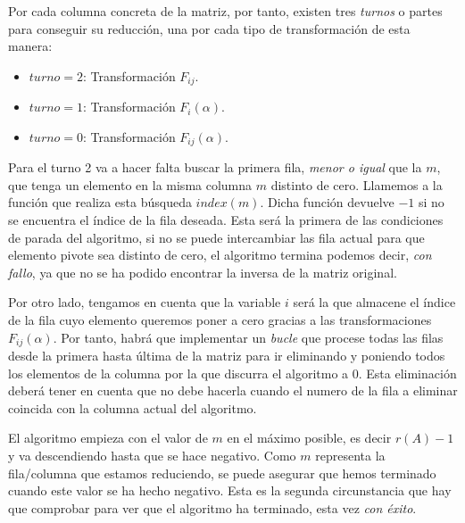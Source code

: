\documentclass[a4paper,10pt]{article}
\begin{document}
Por cada columna concreta de la matriz, por tanto, existen tres \emph{turnos} o partes para conseguir su reducción, una por cada tipo de transformación de esta manera:

\par \vspace{10pt}

\begin{itemize}
	\item $turno = 2$: Transformación $F_{ij}$.
	\item $turno = 1$: Transformación $F_{i}(\alpha)$.
	\item $turno = 0$: Transformación $F_{ij}(\alpha)$.
\end{itemize}

\par \vspace{10pt}

Para el turno 2 va a hacer falta buscar la primera fila, \emph{menor o igual} que la $m$, que tenga un elemento en la misma columna $m$ distinto de cero. Llamemos a la función que realiza esta búsqueda $index(m)$. Dicha función devuelve $-1$ si no se encuentra el índice de la fila deseada. Esta será la primera de las condiciones de parada del algoritmo, si no se puede intercambiar las fila actual para que elemento pivote sea distinto de cero, el algoritmo termina podemos decir, \emph{con fallo}, ya que no se ha podido encontrar la inversa de la matriz original.

\par \vspace{10pt}

Por otro lado, tengamos en cuenta que la variable $i$ será la que almacene el índice de la fila cuyo elemento queremos poner a cero gracias a las transformaciones $F_{ij}(\alpha)$. Por tanto, habrá que implementar un \emph{bucle} que procese todas las filas desde la primera hasta última de la matriz para ir eliminando y poniendo todos los elementos de la columna por la que discurra el algoritmo a 0. Esta eliminación deberá tener en cuenta que no debe hacerla cuando el numero de la fila a eliminar coincida con la columna actual del algoritmo.

\par \vspace{10pt}

El algoritmo empieza con el valor de $m$ en el máximo posible, es decir $r(A) - 1$ y va descendiendo hasta que se hace negativo. Como $m$ representa la fila/columna que estamos reduciendo, se puede asegurar que hemos terminado cuando este valor se ha hecho negativo. Esta es la segunda circunstancia que hay que comprobar para ver que el algoritmo ha terminado, esta vez \emph{con éxito}.
\end{document}
